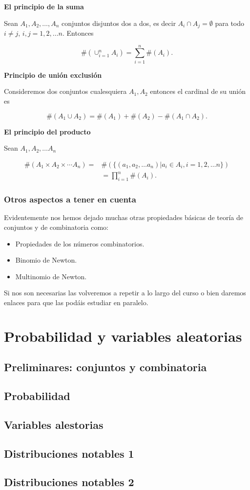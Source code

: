 \documentclass[
  letterpaper,
  DIV=11,
  numbers=noendperiod]{scrreprt}
\providecommand{\tightlist}{%
  \setlength{\itemsep}{0pt}\setlength{\parskip}{0pt}}\usepackage{longtable,booktabs,array}
\begin{document}
\textbf{El principio de la suma}

Sean \(A_1, A_2,\ldots, A_n\) conjuntos disjuntos dos a dos, es decir
\(A_i\cap A_j=\emptyset\) para todo \(i\not= j\), \(i,j=1,2,\ldots n\).
Entonces

\[\#(\cup_{i=1}^n A_i)=\sum_{i=1}^n \#(A_i).\]

\textbf{Principio de unión exclusión}

Consideremos dos conjuntos cualesquiera \(A_1, A_2\) entonces el
cardinal de su unión es

\[\#(A_1\cup A_2)=\#(A_1)+\#(A_2)-\#(A_1\cap A_2).\]

\textbf{El principio del producto}

Sean \(A_1,A_2,\ldots A_n\)

\[
\begin{array}{ll}
\#(A_1\times A_2\times \cdots A_n)=&\#\left(\{(a_1,a_2,\ldots a_n)| a_i\in A_i, i=1,2,\ldots n\}\right)\\
&=\prod_{i=1}^n \#(A_i).
\end{array}
\]

\section{Otros aspectos a tener en
cuenta}\label{otros-aspectos-a-tener-en-cuenta}

Evidentemente nos hemos dejado muchas otras propiedades básicas de
teoría de conjuntos y de combinatoria como:

\begin{itemize}
\tightlist
\item
  Propiedades de los números combinatorios.
\item
  Binomio de Newton.
\item
  Multinomio de Newton.
\end{itemize}

Si nos son necesarias las volveremos a repetir a lo largo del curso o
bien daremos enlaces para que las podáis estudiar en paralelo.

\part{Probabilidad y variables aleatorias}

\chapter{Preliminares: conjuntos y
combinatoria}\label{preliminares-conjuntos-y-combinatoria}

\chapter{Probabilidad}\label{probabilidad}

\chapter{Variables alestorias}\label{variables-alestorias}

\chapter{Distribuciones notables 1}\label{distribuciones-notables-1}

\chapter{Distribuciones notables 2}\label{distribuciones-notables-2}
\end{document}
